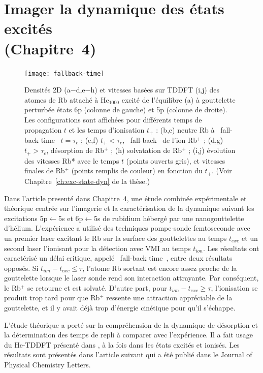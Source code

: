 	\section*{Imager la dynamique des états excités\\\small(Chapitre~4)}	
		\begin{figure}
			\texttt{[image: fallback-time]}\label{fig:fallback-time}
			\caption{Densités 2D (a−d,e−h) et vitesses basées sur TDDFT (i,j) des atomes de Rb attaché à He$_{1000}$ excité de l'équilibre (a) à gouttelette perturbée états 6p (colonne de gauche) et 5p (colonne de droite). Les configurations sont affichées pour différents temps de propagation $t$ et les temps d'ionisation $t_+$ : (b,e) neutre Rb à \guillemotleft~fall-back time~\guillemotright{} $t=\tau_c$ ; (c,f) $t_+<\tau_c$, \guillemotleft~fall-back~\guillemotright{} de l'ion Rb$^+$ ; (d,g) $t_+>\tau_c$, désorption de Rb$^+$ ; (h) solvatation de Rb$^+$ ; (i,j) évolution des vitesses Rb* avec le temps $t$ (points ouverts gris), et vitesses finales de Rb$^+$ (points remplis de couleur) en fonction du $t_+$. (Voir Chapitre~\ref{ch:exc-state-dyn} de la thèse.)}
		\end{figure}		
		Dans l'article presenté dans Chapitre~4, une étude combinée expérimentale et théorique centrée sur l'imagerie et la caractérisation de la dynamique suivant les excitations 5p$\leftarrow$5s et 6p$\leftarrow$5s de rubidium hébergé par une nanogouttelette d'hélium. L'expérience a utilisé des techniques pompe-sonde femtoseconde avec un premier laser excitant le Rb sur la surface des gouttelettes au temps $t_{exc}$ et un second laser l'ionisant pour la détection avec VMI au temps $t_{ion}$. Les résultats ont caractérisé un délai critique, appelé \guillemotleft~fall-back time~\guillemotright, entre deux résultats opposés. Si $t_{ion}-t_{exc}\leq\tau$, l'atome Rb sortant est encore assez proche de la gouttelette lorsque le laser sonde rend son interaction attrayante. Par conséquent, le Rb$^+$ se retourne et est solvaté. D'autre part, pour $t_{ion}-t_{exc}\geq\tau$, l'ionisation se produit trop tard pour que Rb$^+$ ressente une attraction appréciable de la gouttelette, et il y avait déjà trop d'énergie cinétique pour qu'il s'échappe.
		
		L'étude théorique a porté sur la compréhension de la dynamique de désorption et la détermination des temps de repli à comparer avec l'expérience. Il a fait usage du He-TDDFT présenté dans , à la fois dans les états excités et ionisés. Les résultats sont présentés dans l'article suivant qui a été publié dans le Journal of Physical Chemistry Letters\citep{Vangerow2017}.
		
